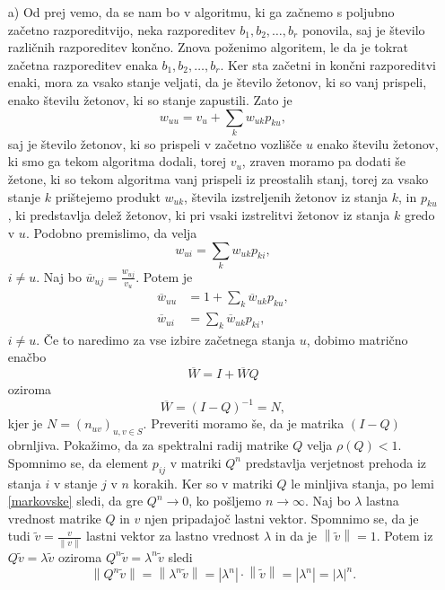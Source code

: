 \documentclass[twoside,11pt]{article}
\begin{document}
\begin{enumerate}
    \item[a)] Od prej vemo, da se nam bo v algoritmu, ki ga začnemo s poljubno začetno razporeditvijo, neka razporeditev $b_{1},b_{2},\ldots,b_{r}$ ponovila, saj je število različnih razporeditev končno. Znova poženimo algoritem, le da je tokrat začetna razporeditev enaka $b_{1},b_{2},\ldots,b_{r}$. Ker sta začetni in končni razporeditvi enaki, mora za vsako stanje veljati, da je število žetonov, ki so vanj prispeli, enako številu žetonov, ki so stanje zapustili. Zato je 
$$w_{uu} = v_{u} + \sum_{k} w_{uk}p_{ku},$$ saj je število žetonov, ki so prispeli v začetno vozlišče $u$ enako številu žetonov, ki smo ga tekom algoritma dodali, torej $v_{u}$, zraven moramo pa dodati še žetone, ki so tekom algoritma vanj prispeli iz preostalih stanj, torej za vsako stanje $k$ prištejemo produkt $w_{uk}$, števila izstreljenih žetonov iz stanja $k$, in $p_{ku}$, ki predstavlja delež žetonov, ki pri vsaki izstrelitvi žetonov iz stanja $k$ gredo v $u$. 
Podobno premislimo, da velja
$$w_{ui} = \sum_{k} w_{uk}p_{ki},$$ $i\neq u$.
Naj bo $\overline{w}_{uj} = \frac{w_{uj}}{v_{u}}$. Potem je 
\[
    \begin{split}
        \overline{w}_{uu} &= 1 + \sum_{k} \overline{w}_{uk}p_{ku}, \\
        \overline{w}_{ui} &= \sum_{k} \overline{w}_{uk}p_{ki}, 
    \end{split}
\]
$i\neq u$.
\noindent Če to naredimo za vse izbire začetnega stanja $u$, dobimo matrično enačbo
$$\overline{W} = I + \overline{W}Q$$
oziroma
$$\overline{W} = (I - Q)^{-1} = N,$$
kjer je $N=(n_{uv})_{u,v \in S}$. Preveriti moramo še, da je matrika $(I-Q)$ obrnljiva. Pokažimo, da za spektralni radij matrike $Q$ velja $\rho(Q) < 1$. Spomnimo se, da element $p_{ij}$ v matriki $Q^n$ predstavlja verjetnost prehoda iz stanja $i$ v stanje $j$ v $n$ korakih. Ker so v matriki $Q$ le minljiva stanja, po lemi \ref{markovske} sledi, da gre $Q^n \rightarrow 0$, ko pošljemo $n\rightarrow \infty$. Naj bo $\lambda$ lastna vrednost matrike $Q$ in $v$ njen pripadajoč lastni vektor. 
Spomnimo se, da je tudi $\widetilde{v} = \frac{v}{\left\lVert v\right\rVert }$ lastni vektor za lastno vrednost $\lambda$ in da je $\left\lVert \widetilde{v}\right\rVert = 1$. Potem iz $Q\widetilde{v} = \lambda\widetilde{v}$ oziroma $Q^n\widetilde{v} = \lambda^n\widetilde{v}$ sledi
\[
    \left\lVert Q^n\widetilde{v} \right\rVert = \left\lVert \lambda^n\widetilde{v}\right\rVert = \left\lvert \lambda^n\right\rvert\cdot \left\lVert \widetilde{v}\right\rVert = \left\lvert \lambda^n\right\rvert = \left\lvert \lambda\right\rvert^n.
\]
\end{enumerate}
\end{document}
